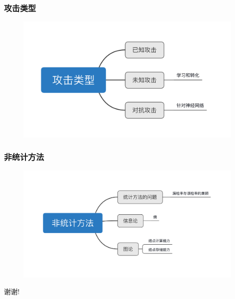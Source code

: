 \documentclass[12pt]{ctexbeamer}
\begin{document}
\begin{frame}
  \frametitle{攻击类型}
  \begin{figure}
    \includegraphics[width=1.0\textwidth]{figures/攻击类型.jpg}
  	\end{figure}

\end{frame}


\begin{frame}
  \frametitle{非统计方法}
  \begin{figure}
    \includegraphics[width=1.0\textwidth]{figures/非统计方法.jpg}
  	\end{figure}

\end{frame}

\begin{frame}
  \centerline{\Large 谢谢!}
\end{frame}
\end{document}
